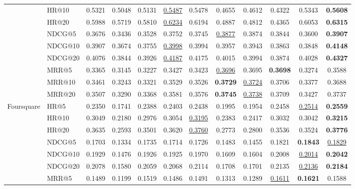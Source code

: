 \documentclass[sigconf,review,anonymous]{acmart}
\newcommand{\tblbest}[1]{\textbf{#1}}
\newcommand{\tblsecond}[1]{\underline{#1}}
\begin{document}
\begin{table}[!t]
{\begin{tabular}{ll*{9}{c}>{\columncolor{routerecgray}}c}
      & HR@10   & 0.5321 & 0.5048 & 0.5131 & \tblsecond{0.5487} & 0.5478 & 0.4655 & 0.4612 & 0.4322 & 0.5343 & \tblbest{0.5608} \\
      & HR@20   & 0.5988 & 0.5719 & 0.5810 & \tblsecond{0.6234} & 0.6194 & 0.4887 & 0.4812 & 0.4365 & 0.6053 & \tblbest{0.6315} \\
      & NDCG@5  & 0.3676 & 0.3436 & 0.3528 & 0.3752 & 0.3745 & \tblsecond{0.3877} & 0.3874 & 0.3844 & 0.3600 & \tblbest{0.3907} \\
      & NDCG@10 & 0.3907 & 0.3674 & 0.3755 & \tblsecond{0.3998} & 0.3994 & 0.3957 & 0.3943 & 0.3863 & 0.3848 & \tblbest{0.4148} \\
      & NDCG@20 & 0.4076 & 0.3844 & 0.3926 & \tblsecond{0.4187} & 0.4175 & 0.4015 & 0.3994 & 0.3874 & 0.4028 & \tblbest{0.4327} \\
      & MRR@5   & 0.3365 & 0.3145 & 0.3227 & 0.3427 & 0.3423 & \tblsecond{0.3696} & 0.3695 & \tblbest{0.3698} & 0.3274 & 0.3588 \\
      & MRR@10  & 0.3461 & 0.3243 & 0.3321 & 0.3529 & 0.3526 & \tblbest{0.3729} & \tblsecond{0.3724} & 0.3706 & 0.3377 & 0.3688 \\
      & MRR@20  & 0.3507 & 0.3290 & 0.3368 & 0.3581 & 0.3576 & \tblbest{0.3745} & \tblsecond{0.3738} & 0.3709 & 0.3427 & 0.3737 \\
    \midrule
    \multirow{9}{*}{Foursquare}
      & HR@5    & 0.2350 & 0.1741 & 0.2388 & 0.2403 & 0.2438 & 0.1995 & 0.1954 & 0.2458 & \tblsecond{0.2514} & \tblbest{0.2559} \\
      & HR@10   & 0.3049 & 0.2180 & 0.2976 & 0.3054 & \tblsecond{0.3195} & 0.2383 & 0.2417 & 0.3032 & 0.3042 & \tblbest{0.3215} \\
      & HR@20   & 0.3635 & 0.2593 & 0.3501 & 0.3620 & \tblsecond{0.3760} & 0.2773 & 0.2800 & 0.3536 & 0.3524 & \tblbest{0.3776} \\
      & NDCG@5  & 0.1703 & 0.1334 & 0.1735 & 0.1714 & 0.1726 & 0.1483 & 0.1455 & 0.1821 & \tblbest{0.1843} & \tblsecond{0.1829} \\
      & NDCG@10 & 0.1929 & 0.1476 & 0.1926 & 0.1925 & 0.1970 & 0.1609 & 0.1604 & 0.2008 & \tblsecond{0.2014} & \tblbest{0.2042} \\
      & NDCG@20 & 0.2078 & 0.1580 & 0.2059 & 0.2068 & 0.2114 & 0.1708 & 0.1701 & 0.2135 & \tblsecond{0.2136} & \tblbest{0.2184} \\
      & MRR@5   & 0.1489 & 0.1199 & 0.1519 & 0.1486 & 0.1491 & 0.1313 & 0.1289 & \tblsecond{0.1611} & \tblbest{0.1621} & 0.1588 \\

\end{tabular}}
\end{table}
\end{document}
